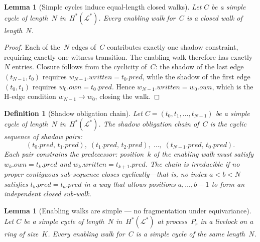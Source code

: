 \documentclass{article}
\newtheorem{lemma}[theorem]{Lemma}
\newtheorem{definition}{Definition}
\newcommand{\Ls}{\mathcal{L}^{*}}
\newcommand{\Hstar}{H^{*}}
\newcommand{\own}{\mathit{own}}
\newcommand{\writ}{\mathit{written}}
\newcommand{\pred}{\mathit{pred}}
\begin{document}
\begin{lemma}[Simple cycles induce equal-length closed walks]
\label{lem:equal-length}
Let $C$ be a simple cycle of length~$N$ in~$\Hstar(\Ls)$.
Every enabling walk for~$C$ is a closed walk of length~$N$.
\end{lemma}

\begin{proof}
Each of the~$N$ edges of~$C$ contributes exactly one shadow
constraint, requiring exactly one witness transition.
The enabling walk therefore has exactly~$N$ entries.
Closure follows from the cyclicity of~$C$:
the shadow of the last edge $(t_{N-1}, t_0)$ requires
$w_{N-1}.\mathit{written} = t_0.\mathit{pred}$,
while the shadow of the first edge $(t_0, t_1)$ requires
$w_0.\mathit{own} = t_0.\mathit{pred}$.
Hence $w_{N-1}.\mathit{written} = w_0.\mathit{own}$,
which is the H-edge condition $w_{N-1} \to w_0$,
closing the walk.
\end{proof}

\begin{definition}[Shadow obligation chain]
\label{def:shadow-chain}
Let $C = (t_0, t_1, \ldots, t_{N-1})$ be a simple cycle of length~$N$
in~$\Hstar(\Ls)$.
The \emph{shadow obligation chain} of~$C$ is the cyclic sequence of
shadow pairs:
\[
  (t_0.\pred,\, t_1.\pred),\;
  (t_1.\pred,\, t_2.\pred),\;
  \ldots,\;
  (t_{N-1}.\pred,\, t_0.\pred).
\]
Each pair constrains the predecessor: position~$k$ of the enabling walk
must satisfy $w_k.\own = t_k.\pred$ and $w_k.\writ = t_{k+1}.\pred$.
The chain is \emph{irreducible} if no proper contiguous sub-sequence
closes cyclically---that is, no index $a < b < N$ satisfies
$t_b.\pred = t_a.\pred$ in a way that allows positions $a, \ldots, b{-}1$
to form an independent closed sub-walk.
\end{definition}

\begin{lemma}[Enabling walks are simple --- no fragmentation under equivariance]
\label{lem:walk-simple}
Let $C$ be a simple cycle of length~$N$ in~$\Hstar(\Ls)$
at process~$P_r$ in a livelock on a ring of size~$K$.
Every enabling walk for~$C$ is a simple cycle of the
same length~$N$.
\end{lemma}
\end{document}
